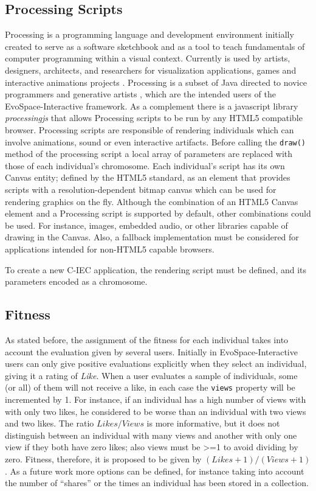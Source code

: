 \documentclass{sig-alternate}
\begin{document}
\subsection{Processing Scripts}
Processing is a programming language and development environment initially created to serve as a software sketchbook and as a tool to teach fundamentals
of computer programming within a visual context.
Currently is used by artists, designers, architects, and researchers for visualization applications, games and interactive animations projects \cite{Reas:2007wp}.
Processing is a subset of Java directed to novice programmers and generative artists \cite{Pearson:2011ti}, which are the intended users of the EvoSpace-Interactive framework.
As a complement there is a javascript library \emph{processingjs} that allows Processing scripts to be run by any HTML5 compatible browser.
Processing scripts are responsible of rendering individuals which can involve animations, sound or even interactive artifacts.
Before calling the \texttt{draw()} method of the processing script a local array of parameters are replaced with those of each individual's chromosome.
Each individual's script has its own Canvas entity; defined by the HTML5 standard, as an element that provides scripts with a resolution-dependent bitmap canvas which can be used for rendering graphics on the fly.
Although the combination of an HTML5 Canvas element and a Processing script is supported by default, other combinations could be used.
For instance, images, embedded audio, or other libraries capable of drawing in the Canvas.
Also, a fallback implementation must be considered for applications intended for non-HTML5 capable browsers.

To create a new C-IEC application, the  rendering script must be defined, and its parameters encoded as a chromosome.    


\subsection{Fitness}
As stated before, the assignment of the fitness for each individual takes into account the evaluation given by several users. Initially in EvoSpace-Interactive users can only give positive evaluations explicitly when they select an individual, giving it a rating of \emph{Like}.
When a user evaluates a sample of individuals, some (or all) of them will not receive a like, in each case the \texttt{views} property will be incremented by 1. For instance, if an individual has a high number of views with with only two likes, he considered to be  worse than an individual with two views and two likes. The ratio $Likes/Views$ is more informative, but it does not distinguish between an individual with many views and another with only
one view if they both have zero likes; also views must be >=1 to avoid dividing by zero. Fitness, therefore, it is proposed to be given by $(Likes+1)/(Views+1)$. As a future work more options can be defined, for instance taking into account the number of ``shares'' or the times an individual has been stored in a collection. 
\end{document}
